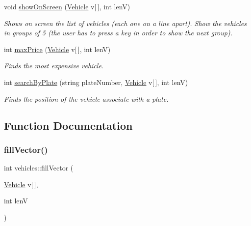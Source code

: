 \begin{DoxyCompactItemize}
void \hyperlink{namespacevehicles_a9b3d0d3ac3b8395396f3ea0bcf5a00c1}{show\+On\+Screen} (\hyperlink{structvehicles_1_1_vehicle}{Vehicle} v\mbox{[}$\,$\mbox{]}, int lenV)
\begin{DoxyCompactList}\small\item\em Shows on screen the list of vehicles (each one on a line apart). Show the vehicles in groups of 5 (the user has to press a key in order to show the next group). \end{DoxyCompactList}\item 
int \hyperlink{namespacevehicles_ad8f2cef9f542cbd16ee04e8dc01c5d58}{max\+Price} (\hyperlink{structvehicles_1_1_vehicle}{Vehicle} v\mbox{[}$\,$\mbox{]}, int lenV)
\begin{DoxyCompactList}\small\item\em Finds the most expensive vehicle. \end{DoxyCompactList}\item 
int \hyperlink{namespacevehicles_ac3f0b7848d7ae853391e63fdf04a3aff}{search\+By\+Plate} (string plate\+Number, \hyperlink{structvehicles_1_1_vehicle}{Vehicle} v\mbox{[}$\,$\mbox{]}, int lenV)
\begin{DoxyCompactList}\small\item\em Finds the position of the vehicle associate with a plate. \end{DoxyCompactList}\end{DoxyCompactItemize}


\subsection{Function Documentation}
\mbox{\label{namespacevehicles_af433e175f2fde47d92c70af7661eef36}} 
\subsubsection{\texorpdfstring{fill\+Vector()}{fillVector()}}
{\footnotesize\ttfamily int vehicles\+::fill\+Vector (\begin{DoxyParamCaption}\item[{\hyperlink{structvehicles_1_1_vehicle}{Vehicle}}]{v\mbox{[}$\,$\mbox{]},  }\item[{int}]{lenV }\end{DoxyParamCaption})}



